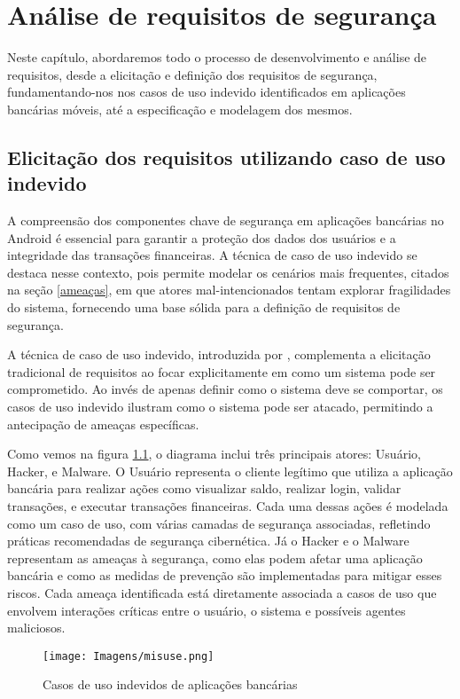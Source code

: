 
    \chapter{Análise de requisitos de segurança}
    Neste capítulo, abordaremos todo o processo de desenvolvimento e análise de requisitos, desde a elicitação e definição dos requisitos de segurança, fundamentando-nos nos casos de uso indevido identificados em aplicações bancárias móveis, até a especificação e modelagem dos mesmos. 


    \section{Elicitação dos requisitos utilizando caso de uso indevido}

    A compreensão dos componentes chave de segurança em aplicações bancárias no Android é essencial para garantir a proteção dos dados dos usuários e a integridade das transações financeiras. A técnica de caso de uso indevido se destaca nesse contexto, pois permite modelar os cenários mais frequentes, citados na seção \ref{ameaças}, em que atores mal-intencionados tentam explorar fragilidades do sistema, fornecendo uma base sólida para a definição de requisitos de segurança.

    A técnica de caso de uso indevido, introduzida por , complementa a elicitação tradicional de requisitos ao focar explicitamente em como um sistema pode ser comprometido. Ao invés de apenas definir como o sistema deve se comportar, os casos de uso indevido ilustram como o sistema pode ser atacado, permitindo a antecipação de ameaças específicas.
    
    Como vemos na figura \ref{misuses}, o diagrama inclui três principais atores: Usuário, Hacker, e Malware. O Usuário representa o cliente legítimo que utiliza a aplicação bancária para realizar ações como visualizar saldo, realizar login, validar transações, e executar transações financeiras. Cada uma dessas ações é modelada como um caso de uso, com várias camadas de segurança associadas, refletindo práticas recomendadas de segurança cibernética. Já o Hacker e o Malware representam as ameaças à segurança, como elas podem afetar uma aplicação bancária e como as medidas de prevenção são implementadas para mitigar esses riscos. Cada ameaça identificada está diretamente associada a casos de uso que envolvem interações críticas entre o usuário, o sistema e possíveis agentes maliciosos.

    \begin{figure}[H]
    \texttt{[image: Imagens/misuse.png]} 
    \caption{Casos de uso indevidos de aplicações bancárias}
    \label{misuses}
    \end{figure}
    
